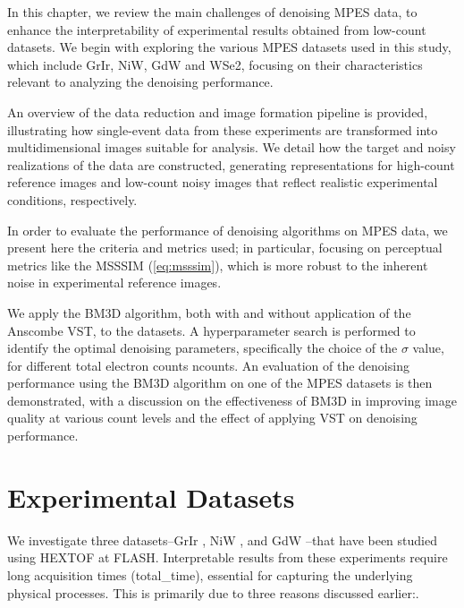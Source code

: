 In this chapter, we review the main challenges of denoising \gls{MPES} data, to enhance the interpretability of experimental results obtained from low-count datasets. We begin with exploring the various \gls{MPES} datasets used in this study, which include \gls{GrIr}, \gls{NiW}, \gls{GdW} and \gls{WSe2}, focusing on their characteristics relevant to analyzing the denoising performance.

An overview of the data reduction and image formation pipeline is provided, illustrating how single-event data from these experiments are transformed into multidimensional images suitable for analysis. We detail how the target and noisy realizations of the data are constructed, generating representations for high-count reference images and low-count noisy images that reflect realistic experimental conditions, respectively.

In order to evaluate the performance of denoising algorithms on \gls{MPES} data, we present here the criteria and metrics used; in particular, focusing on perceptual metrics like the \gls{MSSSIM} (\cref{eq:msssim}), which is more robust to the inherent noise in experimental reference images.

We apply the \gls{BM3D} algorithm, both with and without application of the Anscombe \gls{VST}, to the datasets. A hyperparameter search is performed to identify the optimal denoising parameters, specifically the choice of the $\sigma$ value, for different total electron counts  \gls{ncounts}. An evaluation of the denoising performance using the \gls{BM3D} algorithm on one  of the \gls{MPES} datasets is then demonstrated, with a discussion on the effectiveness of \gls{BM3D} in improving image quality at various count levels and the effect of applying \gls{VST} on denoising performance.

\section{Experimental Datasets}\label{section:datasets}
We investigate three datasets--\gls{GrIr} \cite{heberMultispectralTimeresolvedEnergy2022}, \gls{NiW} \cite{shokeenRealtimeObservationNonequilibrium2024}, and \gls{GdW} \cite{kutnyakhovMultidimensionalPhotoemissionSpectra2024}--that have been studied using \gls{HEXTOF} at \gls{FLASH}. Interpretable results from these experiments require long acquisition times (\gls{total_time}), essential for capturing the underlying physical processes. This is primarily due to three reasons discussed earlier:.


